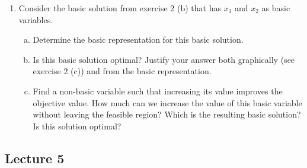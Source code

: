 \documentclass[a4paper, 12pt]{article}
\begin{document}
\begin{enumerate}[1.]
\begin{enumerate}[(a)]
\begin{center}
                                \end{center}
                        \end{enumerate}
                    \item Consider the basic solution from exercise 2 (b) that has $x_1$ and $x_2$ as basic variables.
                        \begin{enumerate}[(a)]
                            \itemsep0em
                            \item Determine the basic representation for this basic solution.
                            \item
                                Is this basic solution optimal?
                                Justify your answer both graphically (see exercise 2 (c)) and from the basic representation.
                            \item
                                Find a non-basic variable such that increasing its value improves the objective value.
                                How much can we increase the value of this basic variable without leaving the feasible region?
                                Which is the resulting basic solution?
                                Is this solution optimal?
                        \end{enumerate}
                \end{enumerate}
        \subsection*{Lecture 5}
\end{document}
